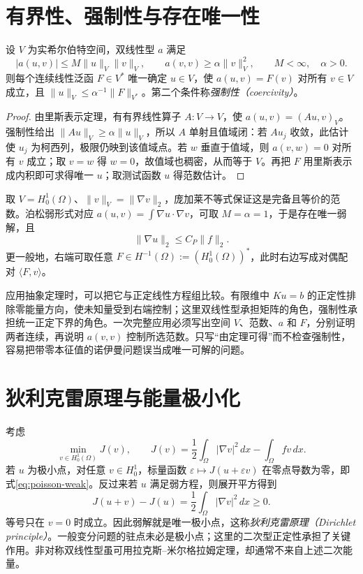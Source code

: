 \section{有界性、强制性与存在唯一性}
\begin{theorem}
设 $V$ 为实希尔伯特空间，双线性型 $a$ 满足
\[
 |a(u,v)|\le M\|u\|_V\|v\|_V,\qquad
 a(v,v)\ge\alpha\|v\|_V^2,
 \qquad M<\infty,\quad\alpha>0.
\]
则每个连续线性泛函 $F\in V^*$ 唯一确定 $u\in V$，使 $a(u,v)=F(v)$ 对所有 $v\in V$ 成立，且 $\|u\|_V\le\alpha^{-1}\|F\|_{V^*}$。第二个条件称\emph{强制性（coercivity）}。
\end{theorem}
\begin{proof}
由里斯表示定理，有有界线性算子 $A:V\to V$，使 $a(u,v)=(Au,v)_V$。强制性给出 $\|Au\|_V\ge\alpha\|u\|_V$，所以 $A$ 单射且值域闭：若 $Au_j$ 收敛，此估计使 $u_j$ 为柯西列，极限仍映到该值域点。若 $w$ 垂直于值域，则 $a(v,w)=0$ 对所有 $v$ 成立；取 $v=w$ 得 $w=0$，故值域也稠密，从而等于 $V$。再把 $F$ 用里斯表示成内积即可求得唯一 $u$；取测试函数 $u$ 得范数估计。
\end{proof}
取 $V=H_0^1(\Omega)$、$\|v\|_V=\|\nabla v\|_2$，庞加莱不等式保证这是完备且等价的范数。泊松弱形式对应 $a(u,v)=\int\nabla u\cdot\nabla v$，可取 $M=\alpha=1$，于是存在唯一弱解，且
\[
 \|\nabla u\|_2\le C_P\|f\|_2.
\]
更一般地，右端可取任意 $F\in H^{-1}(\Omega):=(H_0^1(\Omega))^*$，此时右边写成对偶配对 $\langle F,v\rangle$。

应用抽象定理时，可以把它与正定线性方程组比较。有限维中 $Ku=b$ 的正定性排除零能量方向，使未知量受到右端控制；这里双线性型承担矩阵的角色，强制性承担统一正定下界的角色。一次完整应用必须写出空间 $V$、范数、$a$ 和 $F$，分别证明两者连续，再说明 $a(v,v)$ 控制所选范数。只写“由定理可得”而不检查强制性，容易把带零本征值的诺伊曼问题误当成唯一可解的问题。

\section{狄利克雷原理与能量极小化}
考虑
\begin{equation}
 \min_{v\in H_0^1(\Omega)}J(v),\qquad
 J(v)=\frac12\int_\Omega|\nabla v|^2\,dx-\int_\Omega fv\,dx.
 \label{eq:dirichlet-functional}
\end{equation}
若 $u$ 为极小点，对任意 $v\in H_0^1$，标量函数 $\varepsilon\mapsto J(u+\varepsilon v)$ 在零点导数为零，即式\eqref{eq:poisson-weak}。反过来若 $u$ 满足弱方程，则展开平方得到
\[
 J(u+v)-J(u)=\frac12\int_\Omega|\nabla v|^2\,dx\ge0.
\]
等号只在 $v=0$ 时成立。因此弱解就是唯一极小点，这称\emph{狄利克雷原理（Dirichlet principle）}。一般变分问题的驻点未必是极小点；这里的二次型正定性承担了关键作用。非对称双线性型虽可用拉克斯--米尔格拉姆定理，却通常不来自上述二次能量。


